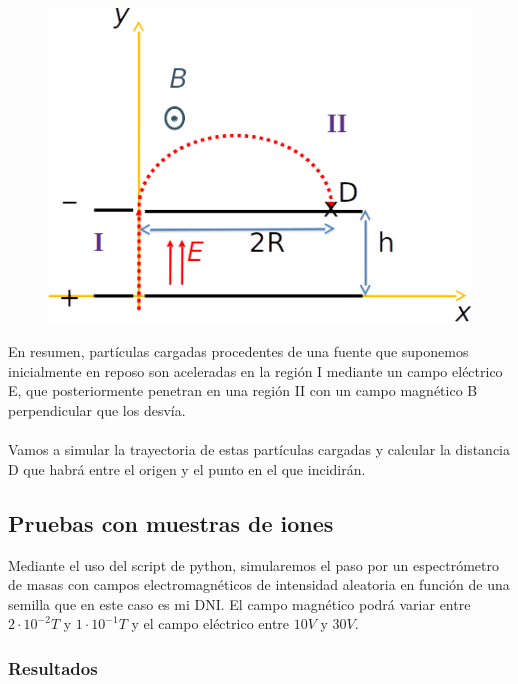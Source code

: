 \documentclass{article}
\begin{document}
    \begin{figure}[h]
    \centering
    \includegraphics[width=.6\textwidth]{Fotos/espectrometro.png}
    \end{figure}
    
    En resumen, partículas cargadas procedentes de una fuente que suponemos inicialmente en reposo son aceleradas en la región I mediante un campo eléctrico E, que posteriormente penetran en una región II con un campo magnético B perpendicular que los desvía. \\\\ Vamos a simular la trayectoria de estas partículas cargadas y calcular la distancia D que habrá entre el origen y el punto en el que incidirán.
    
    \subsection{Pruebas con muestras de iones}
    Mediante el uso del script de python, simularemos el paso por un espectrómetro de masas con campos electromagnéticos de intensidad aleatoria en función de una semilla que en este caso es mi DNI. El campo magnético podrá variar entre $2\cdot10^{-2}T$ y $1\cdot10^{-1}T$ y el campo eléctrico entre $10 V$ y $30 V$.
    
    \clearpage
    
    \subsubsection{Resultados}
    
\end{document}
